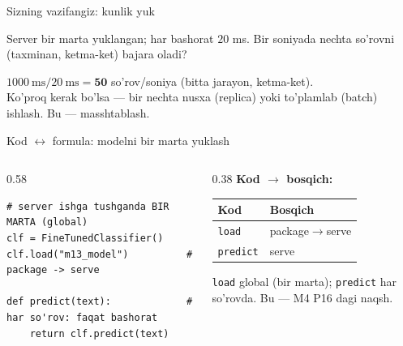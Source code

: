 \documentclass[aspectratio=169,11pt]{beamer}
\begin{document}
\begin{frame}{Sizning vazifangiz: kunlik yuk}
  \begin{tcolorbox}[warnbox,title=Savol --- 60 soniya]
    \small
    Server bir marta yuklangan; har bashorat $20$ ms. Bir soniyada nechta so'rovni
    (taxminan, ketma-ket) bajara oladi?
  \end{tcolorbox}
  \pause
  \begin{tcolorbox}[okbox,title=Javob]
    \small
    $1000\ \text{ms} / 20\ \text{ms} = \mathbf{50}$ so'rov/soniya (bitta jarayon, ketma-ket).\\[3pt]
    \footnotesize Ko'proq kerak bo'lsa --- bir nechta nusxa (replica) yoki
    to'plamlab (batch) ishlash. Bu --- masshtablash.
  \end{tcolorbox}
\end{frame}

\begin{frame}[fragile]{Kod $\leftrightarrow$ formula: modelni bir marta yuklash}
  \begin{columns}[T]
    \begin{column}{0.58\textwidth}
\begin{lstlisting}
# server ishga tushganda BIR MARTA (global)
clf = FineTunedClassifier()
clf.load("m13_model")          # package -> serve

def predict(text):             # har so'rov: faqat bashorat
    return clf.predict(text)
\end{lstlisting}
    \end{column}
    \begin{column}{0.38\textwidth}
      \textbf{Kod $\to$ bosqich:}\\[3pt]
      \footnotesize
      \begin{tabular}{p{1.7cm}p{2.0cm}}
        \toprule
        Kod & Bosqich \\
        \midrule
        \texttt{load} & package$\to$serve \\
        \texttt{predict} & serve \\
        \bottomrule
      \end{tabular}
      \vspace{4pt}
      \begin{tcolorbox}[okbox,top=2pt,bottom=2pt]
        \footnotesize
        \texttt{load} global (bir marta); \texttt{predict} har so'rovda.
        Bu --- M4 P16 dagi naqsh.
      \end{tcolorbox}
    \end{column}
  \end{columns}
\end{frame}
\end{document}
